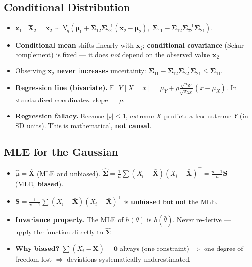 \documentclass[12pt, a4paper]{article}
\begin{document}
\subsection*{Conditional Distribution}
\begin{itemize}[itemsep=5pt]
  \item $\mathbf{x}_1 \mid \mathbf{X}_2 = \mathbf{x}_2 \sim N_q\!\left(\boldsymbol{\mu}_1 + \boldsymbol{\Sigma}_{12}\boldsymbol{\Sigma}_{22}^{-1}(\mathbf{x}_2 - \boldsymbol{\mu}_2),\; \boldsymbol{\Sigma}_{11} - \boldsymbol{\Sigma}_{12}\boldsymbol{\Sigma}_{22}^{-1}\boldsymbol{\Sigma}_{21}\right)$.
  \item \textbf{Conditional mean} shifts linearly with $\mathbf{x}_2$; \textbf{conditional covariance} (Schur complement) is fixed --- it does \textit{not} depend on the observed value $\mathbf{x}_2$.
  \item Observing $\mathbf{x}_2$ \textbf{never increases} uncertainty: $\boldsymbol{\Sigma}_{11} - \boldsymbol{\Sigma}_{12}\boldsymbol{\Sigma}_{22}^{-1}\boldsymbol{\Sigma}_{21} \leq \boldsymbol{\Sigma}_{11}$.
  \item \textbf{Regression line (bivariate).} $\mathbb{E}[Y \mid X = x] = \mu_Y + \rho\frac{\sqrt{\sigma_{YY}}}{\sqrt{\sigma_{XX}}}(x - \mu_X)$. In standardised coordinates: slope $= \rho$.
  \item \textbf{Regression fallacy.} Because $|\rho| \leq 1$, extreme $X$ predicts a less extreme $Y$ (in SD units). This is mathematical, \textbf{not causal}.
\end{itemize}

\subsection*{MLE for the Gaussian}
\begin{itemize}[itemsep=5pt]
  \item $\hat{\boldsymbol{\mu}} = \bar{\mathbf{X}}$ (MLE and unbiased). \quad $\hat{\boldsymbol{\Sigma}} = \frac{1}{n}\sum(X_i - \bar{\mathbf{X}})(X_i-\bar{\mathbf{X}})^\top = \frac{n-1}{n}\mathbf{S}$ (MLE, \textbf{biased}).
  \item $\mathbf{S} = \frac{1}{n-1}\sum(X_i-\bar{\mathbf{X}})(X_i-\bar{\mathbf{X}})^\top$ is \textbf{unbiased} but \textbf{not} the MLE.
  \item \textbf{Invariance property.} The MLE of $h(\theta)$ is $h(\hat{\theta})$. Never re-derive --- apply the function directly to $\hat{\boldsymbol{\Sigma}}$.
  \item \textbf{Why biased?} $\sum(X_i - \bar{\mathbf{X}}) = \mathbf{0}$ always (one constraint) $\Rightarrow$ one degree of freedom lost $\Rightarrow$ deviations systematically underestimated.
\end{itemize}
\end{document}
